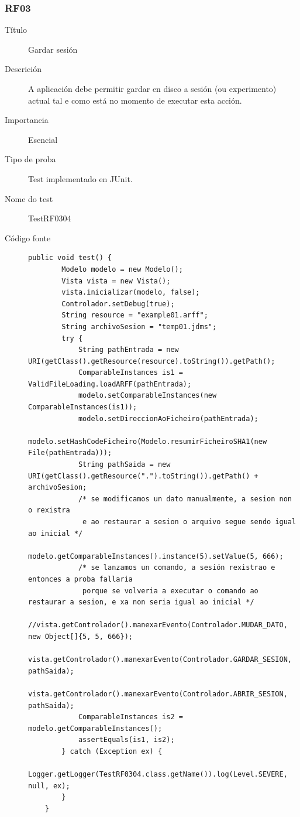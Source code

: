 \subsubsection*{RF03}
\begin{description}
\item[Título] \hfill
Gardar sesión
\item[Descrición] \hfill
A aplicación debe permitir gardar en disco a sesión (ou experimento) actual tal e como está no momento de executar esta acción.
\item[Importancia] \hfill
Esencial
\item[Tipo de proba] \hfill
Test implementado en JUnit.
\item[Nome do test] \hfill
TestRF0304
\item[Código fonte]
\begin{lstlisting}
public void test() {
        Modelo modelo = new Modelo();
        Vista vista = new Vista();
        vista.inicializar(modelo, false);
        Controlador.setDebug(true);
        String resource = "example01.arff";
        String archivoSesion = "temp01.jdms";
        try {
            String pathEntrada = new URI(getClass().getResource(resource).toString()).getPath();
            ComparableInstances is1 = ValidFileLoading.loadARFF(pathEntrada);
            modelo.setComparableInstances(new ComparableInstances(is1));
            modelo.setDireccionAoFicheiro(pathEntrada);
            modelo.setHashCodeFicheiro(Modelo.resumirFicheiroSHA1(new File(pathEntrada)));
            String pathSaida = new URI(getClass().getResource(".").toString()).getPath() + archivoSesion;
            /* se modificamos un dato manualmente, a sesion non o rexistra
             e ao restaurar a sesion o arquivo segue sendo igual ao inicial */
            modelo.getComparableInstances().instance(5).setValue(5, 666);
            /* se lanzamos un comando, a sesión rexistrao e entonces a proba fallaria
             porque se volveria a executar o comando ao restaurar a sesion, e xa non seria igual ao inicial */
            //vista.getControlador().manexarEvento(Controlador.MUDAR_DATO, new Object[]{5, 5, 666});
            vista.getControlador().manexarEvento(Controlador.GARDAR_SESION, pathSaida);
            vista.getControlador().manexarEvento(Controlador.ABRIR_SESION, pathSaida);
            ComparableInstances is2 = modelo.getComparableInstances();
            assertEquals(is1, is2);
        } catch (Exception ex) {
            Logger.getLogger(TestRF0304.class.getName()).log(Level.SEVERE, null, ex);
        }
    }
\end{lstlisting}

\end{description}
